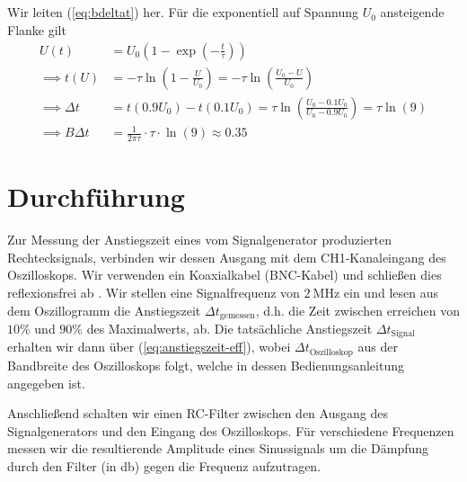 \documentclass{article}
\newcommand{\defc}{black}
\newcommand{\colorT}[2][blue]{\color{#1}{#2}\color{\defc}}
\newcommand{\todo}[1]{\colorT[red]{\textbf{(#1)}}}
\begin{document}
\subsection{}
Wir leiten (\ref{eq:bdeltat}) her. Für die exponentiell auf Spannung $U_0$ ansteigende Flanke gilt
\begin{align*}
  U(t) &= U_0 \left(1 - \exp(-\frac{t}{\tau})\right) \\
  \implies t(U) &= -\tau \ln\left(1 - \frac{U}{U_0}\right) = -\tau \ln\left(\frac{U_0-U}{U_0}\right) \\
  \implies \Delta t &= t(0.9 U_0) - t(0.1 U_0) = \tau \ln\left(\frac{U_0-0.1U_0}{U_0-0.9U_0}\right) = \tau \ln(9) \\
  \implies B \Delta t &= \frac{1}{2\pi\tau} \cdot \tau \cdot \ln(9) \approx 0.35
\end{align*}


\endgroup
\section{Durchführung}
Zur Messung der Anstiegszeit eines vom Signalgenerator produzierten Rechtecksignals,
verbinden wir dessen Ausgang mit dem CH1-Kanaleingang des Oszilloskops. Wir verwenden ein Koaxialkabel (BNC-Kabel)
und schließen dies reflexionsfrei ab \todo{Was bedeutet das?}. Wir stellen eine Signalfrequenz von $\SI{2}{\mega\hertz}$ ein
und lesen aus dem Oszillogramm die Anstiegszeit $\Delta t_\text{gemessen}$, d.h. die Zeit zwischen erreichen von $10\%$ und $90\%$
des Maximalwerts, ab. Die tatsächliche Anstiegszeit $\Delta t_\text{Signal}$ erhalten wir dann über (\ref{eq:anstiegszeit-eff}),
wobei $\Delta t_\text{Oszilloskop}$ aus der Bandbreite des Oszilloskops folgt, welche in dessen Bedienungsanleitung angegeben ist.

Anschließend schalten wir einen RC-Filter zwischen den Ausgang des Signalgenerators und den Eingang des Oszilloskops. Für verschiedene
Frequenzen messen wir die resultierende Amplitude eines Sinussignals um die Dämpfung durch den Filter (in \unit{\decibel})
gegen die Frequenz aufzutragen.


\end{document}
